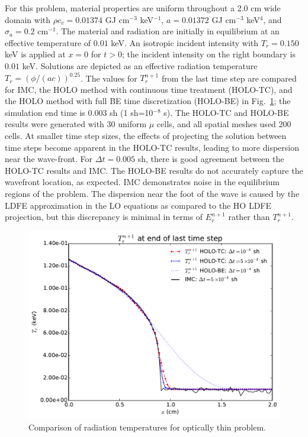 \documentclass{anstrans}
\newcommand{\invcm}[0]{cm$^{-1}$}
\begin{document}
For this problem, material properties
are uniform throughout a 2.0 cm wide domain with $\rho c_v = 0.01374$ GJ cm$^{-3}$
keV$^{-1}$, $a=0.01372$ GJ cm$^{-3}$ keV$^{4}$, and $\sigma_a=0.2$ \invcm.  
The material and radiation are initially in equilibrium at an effective temperature of $0.01$ keV.
An isotropic incident intensity with $T_r = 0.150$ keV is applied
at $x=0$ for $t>0$; the incident intensity on the right boundary is $0.01$ keV.
 Solutions are depicted as an effective radiation temperature
 $T_r=\left(\phi/(ac)\right)^{0.25}$. The values for $T_r^{n+1}$ from the last
 time step are compared for IMC, the HOLO method with continuous time treatment (HOLO-TC), and
 the HOLO method with full BE time discretization (HOLO-BE) in
 Fig.~\ref{fig:thin_temp_compare}; the simulation end time is 0.003 sh (1 sh=10$^{-8}$ s). The HOLO-TC and HOLO-BE results were generated with 30
uniform $\mu$ cells, and all spatial meshes used 200 cells.  At smaller time step sizes, the
effects of projecting the solution between time steps become apparent in the HOLO-TC results, leading to more
dispersion near the wave-front.  For $\Delta t=0.005$ sh, there is good agreement between
the HOLO-TC results and IMC.  The HOLO-BE results do not accurately capture
the wavefront location, as expected. IMC demonstrates noise in the equilibrium
regions of the problem. The dispersion near the foot of the wave is caused by
the LDFE approximation in the LO equations as compared to the HO LDFE projection, but this discrepancy is minimal in
terms of $E_r^{n+1}$ rather than $T_r^{n+1}$.
\begin{figure}
  \centering
    \includegraphics[width=0.92\linewidth]{thin_temp_compare.pdf}
    \caption{\label{fig:thin_temp_compare} Comparison of radiation temperatures for optically thin
        problem. }
\end{figure}
\end{document}

